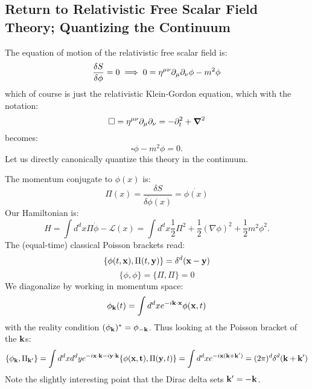 \subsection{Return to Relativistic Free Scalar Field Theory; Quantizing the Continuum}
The equation of motion of the relativistic free scalar field is:
\begin{equation}
    \frac{\delta S}{\delta \phi} = 0 \implies 0 = \eta^{\mu\nu}\partial_\mu\partial_\nu \phi - m^2\phi
\end{equation}
which of course is just the relativistic Klein-Gordon equation, which with the notation:
\begin{equation}
    \square = \eta^{\mu\nu}\p_\mu\p_\nu = -\p_t^2 + \nabla^2
\end{equation}
becomes:
\begin{equation}
    \square \phi - m^2\phi = 0.
\end{equation}
Let us directly canonically quantize this theory in the continuum.

The momentum conjugate to $\phi(x)$ is:
\begin{equation}
    \Pi(x) = \frac{\delta S}{\delta \dot{\phi}(x)} = \dot{\phi(x)}
\end{equation}
Our Hamiltonian is:
\begin{equation}
    H = \int d^dx \Pi \dot{\phi} - \mathcal{L}(x) = \int d^dx \frac{1}{2}\Pi^2 + \frac{1}{2}(\nabla \phi)^2 + \frac{1}{2}m^2\phi^2.
\end{equation}
The (equal-time) classical Poisson brackets read:
\begin{equation}
    \{\phi(t, \mathbf{x}), \Pi(t, \mathbf{y})\} = \delta^d(\mathbf{x} - \mathbf{y})
\end{equation}
\begin{equation}
    \{\phi, \phi\} = \{\Pi, \Pi\} = 0
\end{equation}
We diagonalize by working in momentum space:
\begin{equation}
    \phi_{\mathbf{k}}(t) = \int d^dx e^{-i\mathbf{k}\cdot\mathbf{x}}\phi(\mathbf{x}, t)
\end{equation}
with the reality condition $(\phi_{\mathbf{k}})^* = \phi_{-\mathbf{k}}$. Thus looking at the Poisson bracket of the $\mathbf{k}$s:
\begin{equation}
    \{\phi_{\mathbf{k}}, \Pi_{\mathbf{k}'}\} = \int d^dx d^dy e^{-i\mathbf{x}\cdot \mathbf{k} - i\mathbf{y} \cdot \mathbf{k}} \{\phi(\mathbf{x, t}), \Pi(\mathbf{y}, t)\} = \int d^dx e^{-i\mathbf{x}(\mathbf{k} + \mathbf{k}')} = (2\pi)^d \delta^d(\mathbf{k} + \mathbf{k}')
\end{equation}
Note the slightly interesting point that the Dirac delta sets $\mathbf{k}' = -\mathbf{k}$. 

